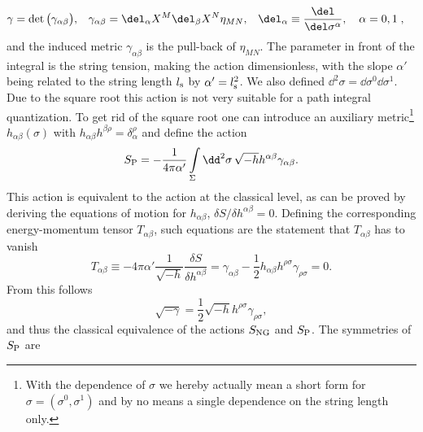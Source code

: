 %
%
\begin{align}
\gamma &= \det \big(\gamma_{\alpha\beta}\big), & \gamma_{\alpha\beta} &= \del_{\alpha}X^{M}\del_{\beta}X^{N}\eta_{MN}, & \del_{\alpha}&\equiv \frac{\del}{\del\sigma^{\alpha}},\quad \alpha=0,1\;,
\end{align}
%
%
and the induced metric $\gamma_{\alpha\beta}$ is the pull-back of $\eta_{MN}$. The parameter in front of the integral is the string tension, making the action dimensionless, with the  slope $\alpha'$ being related to the string length $l_{\rm s}$ by $\alpha'=l_{\rm s}^{2}$. We also defined $\dd^{2}\sigma = \dd\sigma^{0}\dd\sigma^{1}$. Due to the square root this action is not very suitable for a path integral quantization. To get rid of the square root one can introduce an auxiliary metric\footnote{With the dependence of $\sigma$ we hereby actually mean a short form for $\sigma=(\sigma^{0},\sigma^{1})$ and by no means a single dependence on the string length only.} $h_{\alpha\beta}(\sigma)$ with $h_{\alpha\beta}h^{\beta\rho}=\delta_{\alpha}^{\rho}$ and define the  action
%
%
\begin{equation}
S_{\rm P} = -\frac{1}{4\pi\alpha'} \int\limits_{\Sigma}\dd^{2}\sigma\, \sqrt{-h}h^{\alpha\beta}\gamma_{\alpha\beta}.
\end{equation}
%
%
This action is equivalent to the  action at the classical level, as can be proved by deriving the equations of motion for $h_{\alpha\beta}$, $\delta S/ \delta h^{\alpha\beta} = 0$. Defining the corresponding energy-momentum tensor $T_{\alpha\beta}$, such equations are the statement that $T_{\alpha\beta}$ has to vanish
%
%
\begin{equation}
T_{\alpha\beta} \equiv -4\pi\alpha' \frac{1}{\sqrt{-h}} \frac{\delta S}{\delta h^{\alpha\beta}} = \gamma_{\alpha\beta} - \frac{1}{2} h_{\alpha\beta} h^{\rho\sigma}\gamma_{\rho\sigma} = 0.
\end{equation}
%
%
From this follows
%
%
\begin{equation}
\sqrt{-\gamma} = \frac{1}{2} \sqrt{-h} h^{\rho\sigma} \gamma_{\rho\sigma},
\end{equation}
%
%
and thus the classical equivalence of the actions $S_{\rm NG}$ and $S_{\rm P}$. The symmetries of $S_{\rm P}$ are
%
%
